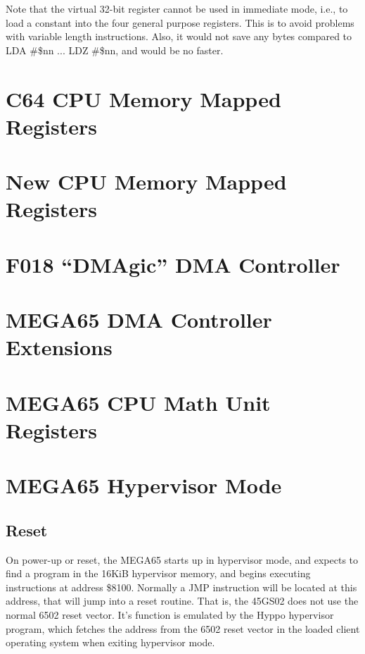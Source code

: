 Note that the virtual 32-bit register cannot be used in immediate mode, i.e., to load a constant into the four general
purpose registers.  This is to
avoid problems with variable length instructions. Also, it would not save any bytes
compared to LDA \#\$nn ... LDZ \#\$nn, and would be no faster.


\section{C64 CPU Memory Mapped Registers}



\section{New CPU Memory Mapped Registers}



\section{F018 ``DMAgic'' DMA Controller}



\section{MEGA65 DMA Controller Extensions}



\section{MEGA65 CPU Math Unit Registers}



\section{MEGA65 Hypervisor Mode}
\label{sec:hypervisor-mode}

\subsection{Reset}

On power-up or reset, the MEGA65 starts up in hypervisor mode, and expects to find a program in the
16KiB hypervisor memory, and begins executing instructions at address \$8100.  Normally a JMP instruction
will be located at this address, that will jump into a reset routine. That is, the 45GS02
does not use the normal 6502 reset vector. It's function is emulated by the Hyppo hypervisor program,
which fetches the address from the 6502 reset vector in the loaded client operating system when
exiting hypervisor mode.

